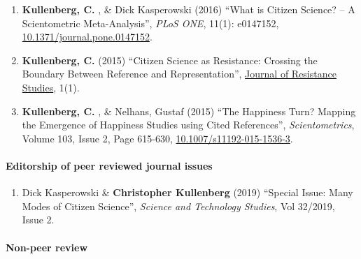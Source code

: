 \documentclass[
]{article}
\providecommand{\tightlist}{%
  \setlength{\itemsep}{0pt}\setlength{\parskip}{0pt}}
\begin{document}
\begin{enumerate}
\item
  \textbf{Kullenberg, C.} , \& Dick Kasperowski (2016) ``What is Citizen
  Science? -- A Scientometric Meta-Analysis'', \emph{PLoS ONE}, 11(1):
  e0147152,
  \href{http://dx.doi.org/10.1371/journal.pone.0147152}{10.1371/journal.pone.0147152}.
\item
  \textbf{Kullenberg, C.} (2015) ``Citizen Science as Resistance:
  Crossing the Boundary Between Reference and Representation'',
  \href{https://gup.ub.gu.se/publication/218601-citizen-science-as-resistance-crossing-the-boundary-between-reference-and-representation}{Journal
  of Resistance Studies}, 1(1).
\item
  \textbf{Kullenberg, C.} , \& Nelhans, Gustaf (2015) ``The Happiness
  Turn? Mapping the Emergence of Happiness Studies using Cited
  References'', \emph{Scientometrics}, Volume 103, Issue 2, Page
  615-630,
  \href{http://dx.doi.org/10.1007/s11192-015-1536-3}{10.1007/s11192-015-1536-3}.
\end{enumerate}

\hypertarget{editorship-of-peer-reviewed-journal-issues}{%
\paragraph{Editorship of peer reviewed journal
issues}\label{editorship-of-peer-reviewed-journal-issues}}

\begin{enumerate}
\def\labelenumi{\arabic{enumi}.}
\tightlist
\item
  Dick Kasperowski \& \textbf{Christopher Kullenberg} (2019) ``Special
  Issue: Many Modes of Citizen Science'', \emph{Science and Technology
  Studies}, Vol 32/2019, Issue 2.
\end{enumerate}

\hypertarget{non-peer-review}{%
\paragraph{Non-peer review}\label{non-peer-review}}
\end{document}
